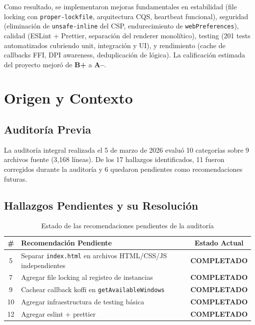 \documentclass[12pt,a4paper]{article}
\begin{document}
Como resultado, se implementaron mejoras fundamentales en estabilidad (file locking con \texttt{proper-lockfile}, arquitectura CQS, heartbeat funcional), seguridad (eliminaci\'on de \texttt{unsafe-inline} del CSP, endurecimiento de \texttt{webPreferences}), calidad (ESLint + Prettier, separaci\'on del renderer monol\'itico), testing (201 tests automatizados cubriendo unit, integraci\'on y UI), y rendimiento (cache de callbacks FFI, DPI awareness, deduplicaci\'on de l\'ogica). La calificaci\'on estimada del proyecto mejor\'o de \textbf{B+} a \textbf{A--}.

\section{Origen y Contexto}

\subsection{Auditor\'ia Previa}
La auditor\'ia integral realizada el 5 de marzo de 2026 evalu\'o 10 categor\'ias sobre 9 archivos fuente (3,168 l\'ineas). De los 17 hallazgos identificados, 11 fueron corregidos durante la auditor\'ia y 6 quedaron pendientes como recomendaciones futuras.

\subsection{Hallazgos Pendientes y su Resoluci\'on}

\begin{table}[H]
\centering
\renewcommand{\arraystretch}{1.3}
\begin{tabularx}{\textwidth}{c X c}
\toprule
\textbf{\#} & \textbf{Recomendaci\'on Pendiente} & \textbf{Estado Actual} \\
\midrule
5 & Separar \texttt{index.html} en archivos HTML/CSS/JS independientes & \textcolor{accentgreen}{\textbf{COMPLETADO}} \\
7 & Agregar file locking al registro de instancias & \textcolor{accentgreen}{\textbf{COMPLETADO}} \\
9 & Cachear callback koffi en \texttt{getAvailableWindows} & \textcolor{accentgreen}{\textbf{COMPLETADO}} \\
10 & Agregar infraestructura de testing b\'asica & \textcolor{accentgreen}{\textbf{COMPLETADO}} \\
12 & Agregar eslint + prettier & \textcolor{accentgreen}{\textbf{COMPLETADO}} \\
\bottomrule
\end{tabularx}
\caption{Estado de las recomendaciones pendientes de la auditor\'ia}
\end{table}
\end{document}
